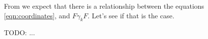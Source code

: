 \documentclass{article}
\begin{document}
From \cite{doran2003gap} we expect that there is a relationship between
the equations \ref{eqn:coordinates}, and $F \gamma_k F$.  Let's see if that
is the case.

TODO: ...

%
%
%
%
%



\end{document}
